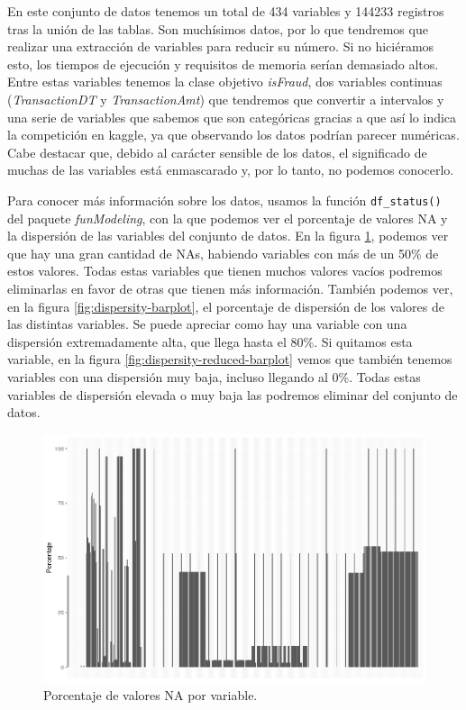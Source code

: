En este conjunto de datos tenemos un total de 434 variables y 144233 registros
tras la unión de las tablas. Son muchísimos datos, por lo que tendremos que
realizar una extracción de variables para reducir su número. Si no hiciéramos
esto, los tiempos de ejecución y requisitos de memoria serían demasiado altos.
Entre estas variables tenemos la clase objetivo \textit{isFraud}, dos variables
continuas (\textit{TransactionDT} y \textit{TransactionAmt}) que tendremos que
convertir a intervalos y una serie de variables que sabemos que son categóricas
gracias a que así lo indica la competición en kaggle, ya que observando los
datos podrían parecer numéricas. Cabe destacar que, debido al carácter sensible
de los datos, el significado de muchas de las variables está enmascarado y, por
lo tanto, no podemos conocerlo.

Para conocer más información sobre los datos, usamos la función
\lstinline{df_status()} del paquete \textit{funModeling}, con la que podemos ver
el porcentaje de valores NA y la dispersión de las variables del conjunto de
datos. En la figura \ref{fig:na-barplot}, podemos ver que hay una gran cantidad
de NAs, habiendo variables con más de un 50\% de estos valores. Todas estas
variables que tienen muchos valores vacíos podremos eliminarlas en favor de otras
que tienen más información. También podemos ver, en la figura
\ref{fig:dispersity-barplot}, el porcentaje de dispersión de los valores de las
distintas variables. Se puede apreciar como hay una variable con una dispersión
extremadamente alta, que llega hasta el 80\%. Si quitamos esta variable, en la
figura \ref{fig:dispersity-reduced-barplot} vemos que también tenemos variables
con una dispersión muy baja, incluso llegando al 0\%. Todas estas variables de
dispersión elevada o muy baja las podremos eliminar del conjunto de datos.

\begin{figure}
    \includegraphics[width=\textwidth]{images/exploration/na-barplot.png}
    \caption{Porcentaje de valores NA por variable.}
    \label{fig:na-barplot}
\end{figure}

